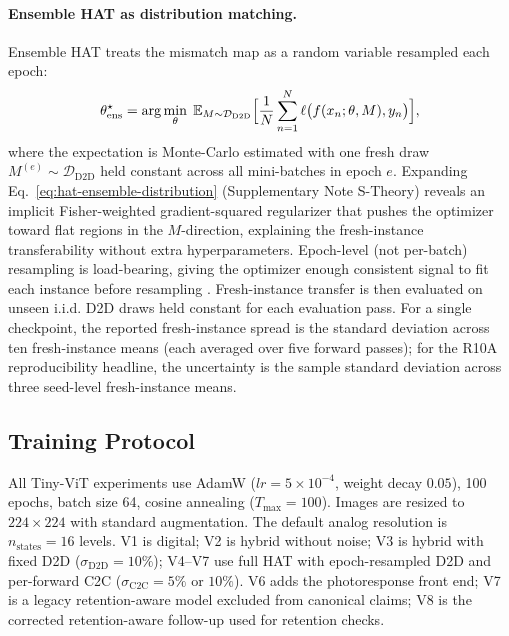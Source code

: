 \paragraph{Ensemble HAT as distribution matching.}
Ensemble HAT treats the mismatch map as a random variable resampled each epoch:
\begin{equation}
    \theta_{\text{ens}}^{\star} = \arg\min_{\theta}\;\mathbb{E}_{M\sim\mathcal{D}_{\text{D2D}}}\Bigl[\frac{1}{N}\sum_{n=1}^{N}\ell\bigl(f(x_n;\theta,M),y_n\bigr)\Bigr],
    \label{eq:hat-ensemble-distribution}
\end{equation}
where the expectation is Monte-Carlo estimated with one fresh draw $M^{(e)}\sim\mathcal{D}_{\text{D2D}}$ held constant across all mini-batches in epoch $e$. Expanding Eq.~\ref{eq:hat-ensemble-distribution} (Supplementary Note S-Theory) reveals an implicit Fisher-weighted gradient-squared regularizer that pushes the optimizer toward flat regions in the $M$-direction, explaining the fresh-instance transferability without extra hyperparameters. Epoch-level (not per-batch) resampling is load-bearing, giving the optimizer enough consistent signal to fit each instance before resampling \citep{tobin2017domain}. Fresh-instance transfer is then evaluated on unseen i.i.d. D2D draws held constant for each evaluation pass. For a single checkpoint, the reported fresh-instance spread is the standard deviation across ten fresh-instance means (each averaged over five forward passes); for the R10A reproducibility headline, the uncertainty is the sample standard deviation across three seed-level fresh-instance means.

\subsection{Training Protocol}
\label{subsec:training-protocol}

All Tiny-ViT experiments use AdamW ($lr = 5\times10^{-4}$, weight decay $0.05$), 100 epochs, batch size 64, cosine annealing ($T_{\max}=100$). Images are resized to $224\times224$ with standard augmentation. The default analog resolution is $n_{\mathrm{states}}=16$ levels. V1 is digital; V2 is hybrid without noise; V3 is hybrid with fixed D2D ($\sigma_{\mathrm{D2D}}=10\%$); V4--V7 use full HAT with epoch-resampled D2D and per-forward C2C ($\sigma_{\mathrm{C2C}}=5\%$ or $10\%$). V6 adds the photoresponse front end; V7 is a legacy retention-aware model excluded from canonical claims; V8 is the corrected retention-aware follow-up used for retention checks.

